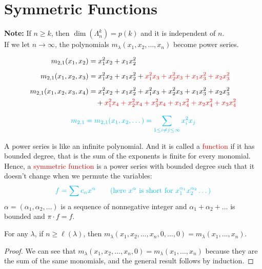 \documentclass[12pt]{memoir}
\begin{document}
\section{Symmetric Functions}

\textbf{Note:} If $n \ge k$, then $\dim(\Lambda_n^k) = p(k)$ and it is independent of $n$.\\
If we let $n \to \infty$, the polynomials $m_\lambda(x_1, x_2, \dots, x_n)$ become power series.

\begin{align*}
    m_{2,1}(x_1, x_2) &= x_1^2 x_2 + x_1 x_2^2\\[0.5em]
    m_{2,1}(x_1, x_2, x_3) &= x_1^2 x_2 + x_1 x_2^2 + \textcolor{red}{x_1^2 x_3 + x_2^2 x_3 + x_1 x_3^2 + x_2 x_3^2}\\[0.5em]
    m_{2,1}(x_1, x_2, x_3, x_4) &= x_1^2 x_2 + x_1 x_2^2 + x_1^2 x_3 + x_2^2 x_3 + x_1 x_3^2 + x_2 x_3^2\\
    &\quad + \textcolor{red}{x_1^2 x_4 + x_2^2 x_4 + x_3^2 x_4 + x_1 x_4^2 + x_2 x_4^2 + x_3 x_4^2}
\end{align*}

\[
\textcolor{celesUCR}{m_{2,1} = m_{2,1}(x_1, x_2, \dots) = \sum_{1 \le i \neq j \le \infty} x_i^2 x_j}
\]

A power series is like an infinite polynomial. And it is called a \textcolor{red}{function} if it has bounded degree, that is the sum of the exponents is finite for every monomial.\\
Hence, a \textcolor{red}{symmetric function} is a power series with bounded degree such that it doesn't change when we permute the variables:
\[
\textcolor{celesUCR}{f = \sum c_\alpha x^\alpha \qquad (\text{here } x^\alpha \text{ is short for } x_1^{\alpha_1} x_2^{\alpha_2} \dots)}
\]
$\alpha = (\alpha_1, \alpha_2, \dots)$ is a sequence of nonnegative integer and $\alpha_1 + \alpha_2 + \dots$ is bounded and $\pi \cdot f = f$.

\begin{ptcb}
\begin{Prop}
For any $\lambda$, if $n \ge \ell(\lambda)$, then $m_\lambda(x_1, x_2, \dots, x_n, 0, \dots, 0) = m_\lambda(x_1, \dots, x_n)$.
\end{Prop}
\end{ptcb}

\begin{proof}
We can see that $m_\lambda(x_1, x_2, \dots, x_n, 0) = m_\lambda(x_1, \dots, x_n)$ because they are the sum of the same monomials, and the general result follows by induction.
\end{proof}
\end{document}
